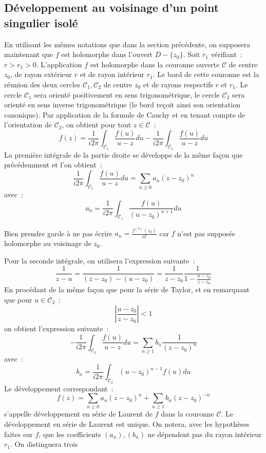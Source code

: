\subsection{Développement au voisinage d'un point singulier isolé}
En utilisant les mêmes notations que dans la section précédente, on supposera
maintenant que $f$ est holomorphe dans l'ouvert $D- \{ z_0 \}$.
Soit $r_1$ vérifiant~:$r > r_1 > 0$. L'application $f$ est holomorphe dans
la couronne ouverte $\mathcal{C}$ de centre $z_0$, de rayon extérieur $r$ et de
rayon intérieur $r_1$. Le bord de cette couronne est la réunion des deux
cercles $\mathcal{C}_1, \mathcal{C}_2$ de centre $z_0$ et de rayons respectifs
$r$ et $r_1$. Le cercle $\mathcal{C}_1$ sera orienté positivement en sens
trigonométrique, le cercle $\mathcal{C}_2$ sera orienté en sens inverse
trigonométrique (le bord reçoit ainsi son orientation canonique). Par
application de la formule de Cauchy et en tenant compte de l'orientation de
$\mathcal{C}_2$, on obtient pour tout $z \in \mathcal{C}$~:
\[
f(z) = \frac{1}{i2 \pi} \int_{\mathcal{C}_1} \frac{f(u)}{u-z}du - \frac{1}{i2
\pi} \int_{\mathcal{C}_2} \frac{f(u)}{u-z}du
\]
La première intégrale de la partie droite se développe de la même façon que
précédemment et l'on obtient~:
\[
\frac{1}{i2 \pi} \int_{\mathcal{C}_1} \frac{f(u)}{u-z}du = \sum_{n \geq 0} a_n
(z-z_0)^n
\]
avec~:
\[
a_n = \frac{1}{i2\pi} \int_{\mathcal{C}_1} \frac{f(u)}{(u-z_0)^{n+1}}du
\]
\begin{rem}
Bien prendre garde à ne pas écrire $a_n=\frac{f^{(n)}(z_0)}{n!}$ car $f$ n'est
pas supposée holomorphe au voisinage de $z_0$.
\end{rem}
Pour la seconde intégrale, on utilisera l'expression suivante~:
\[
\frac{1}{z-u} = \frac{1}{(z-z_0)-(u-z_0)} = \frac{1}{z-z_0}\frac{1}{1-
\frac{u-z_0}{z-z_0}}
\]
En procédant de la même façon que pour la série de Taylor, et en remarquant que
pour $u \in \mathcal{C}_2$~:
\[
\left | \frac{u-z_0}{z-z_0} \right | < 1
\]
on obtient l'expression suivante~:
\[
- \frac{1}{i 2 \pi} 
\int_{\mathcal{C}_2} \frac{f(u)}{u-z}du = \sum_{n \geq 1} b_n
\frac{1}{(z-z_0)^n}
\]
avec~:
\[
b_n = \frac{1}{i2\pi} \int_{\mathcal{C}_2} (u-z_0)^{n-1}f(u) du
\]
Le développement correspondant~:
\[
f(z) = \sum_{n \geq 0} a_n
(z-z_0)^n + \sum_{n \geq 1} b_n (z-z_0)^{-n}
\]
s'appelle développement en série de Laurent de $f$ dans la couronne
$\mathcal{C}$.
Le développement en série de Laurent est unique.
On notera, avec les hypothèses faites sur $f$, que les coefficients
$(a_n),(b_n)$ ne dépendent pas du rayon intérieur $r_1$. On distinguera trois
